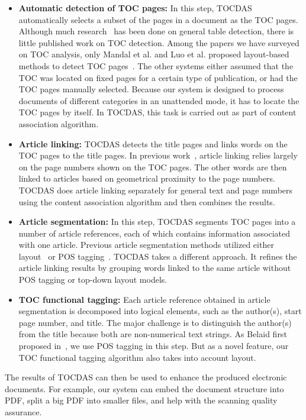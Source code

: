 \documentclass[10pt]{article}
\begin{document}
\begin{itemize}
\item \textbf{Automatic detection of TOC pages:} In this step, TOCDAS automatically selects a subset of the pages in a document as the TOC pages. Although much research~\cite{Hu2000,Wang2002} has been done on general table detection, there is little published work on TOC detection. Among the papers we have surveyed on TOC analysis, only Mandal et al. and Luo et al. proposed layout-based methods to detect TOC pages~\cite{Mandal2003,Luo1996}. The other systems either assumed that the TOC was located on fixed pages for a certain type of publication, or had the TOC pages manually selected. Because our system is designed to process documents of different categories in an unattended mode, it has to locate the TOC pages by itself. In TOCDAS, this task is carried out as part of content association algorithm.
\item \textbf{Article linking:} TOCDAS detects the title pages and links words on the TOC pages to the title pages. In previous work~\cite{Belaid2001,Lin1997}, article linking relies largely on the page numbers shown on the TOC pages. The other words are then linked to articles based on geometrical proximity to the page numbers. TOCDAS does article linking separately for general text and page numbers using the content association algorithm and then combines the results.
\item \textbf{Article segmentation:} In this step, TOCDAS segments TOC pages into a number of article references, each of which contains information associated with one article. Previous article segmentation methods utilized either layout~\cite{Lin1997,Story1992,Mandal2003,Tsuruoka2001} or POS tagging~\cite{Belaid2001}. TOCDAS takes a different approach. It refines the article linking results by grouping words linked to the same article without POS tagging or top-down layout models.
\item \textbf{TOC functional tagging:} Each article reference obtained in article segmentation is decomposed into logical elements, such as the author(s), start page number, and title. The major challenge is to distinguish the author(s) from the title because both are non-numerical text strings. As Belaid first proposed in~\cite{Belaid2001}, we use POS tagging in this step. But as a novel feature, our TOC functional tagging algorithm also takes into account layout.
\end{itemize}

The results of TOCDAS can then be used to enhance the produced electronic documents. For example, our system can embed the document structure into PDF, split a big PDF into smaller files, and help with the scanning quality assurance.
\end{document}
